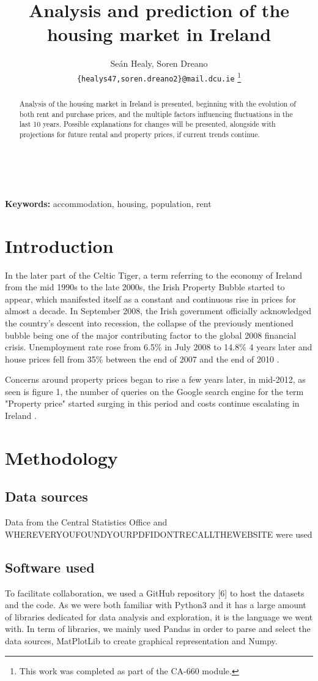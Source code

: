 \documentclass[twocolumn]{article}
\title{Analysis and prediction of the housing market in Ireland}
\author{
    Seán Healy, Soren Dreano\\
    \texttt{\{healys47,soren.dreano2\}@mail.dcu.ie}
    \footnote{This work was completed as part of the CA-660 module.}
}
\begin{document}
\maketitle
\begin{abstract}
Analysis of the housing market in Ireland is presented, beginning with the
evolution of both rent and purchase prices, and the multiple factors
influencing fluctuations in the last 10 years. Possible explanations for
changes will be presented, alongside with projections for future rental and
property prices, if current trends continue.
\end{abstract}\\\\
{\bf Keywords:} accommodation, housing, population, rent

\section{Introduction\label{s:intro}}

In the later part of the Celtic Tiger, a term referring to the economy of Ireland from the mid 1990s to the late 2000s, the Irish Property Bubble started to appear, which manifested itself as a constant and continuous rise in prices for almost a decade. In September 2008, the Irish government officially acknowledged the country's descent into recession\cite{kollewe08}, the collapse of the previously mentioned bubble being one of the major contributing factor to the global 2008 financial crisis. Unemployment rate rose from 6.5\% in July 2008 to 14.8\% 4 years later \cite{cso14} and house prices fell from 35\% between the end of 2007 and the end of 2010 \cite{environ10}.

Concerns around property prices began to rise a few years later, in mid-2012, as seen is figure 1, the number of queries on the Google search engine for the term "Property price" started surging in this period and costs continue escalating in Ireland \cite{kennedy21}.

\section{Methodology}
\subsection{Data sources}
Data from the Central Statistics Office and
WHEREVERYOUFOUNDYOURPDFIDONTRECALLTHEWEBSITE were used

\subsection{Software used}
To facilitate collaboration, we used a GitHub repository [6] to host the datasets and the code. As we were both familiar with Python3 and it has a large amount of libraries dedicated for data analysis and exploration, it is the language we went with. In term of libraries, we mainly used Pandas in order to parse and select the data sources, MatPlotLib to create graphical representation and Numpy.
\end{document}
